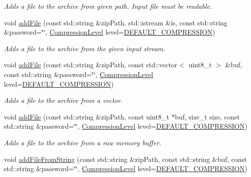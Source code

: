 \begin{DoxyCompactItemize}
\begin{DoxyCompactList}\small\item\em Adds a file to the archive from given path. Input file must be readable. \end{DoxyCompactList}\item 
void \hyperlink{group___utility_module_ga14fc46ab41bdf091a4e278e941e175a0}{add\+File} (const std\+::string \&zip\+Path, std\+::istream \&is, const std\+::string \&password=\char`\"{}\char`\"{}, \hyperlink{classdg_1_1deepcore_1_1_zip_file_afbf537eaa2281817c203388707564bdd}{Compression\+Level} level=\hyperlink{classdg_1_1deepcore_1_1_zip_file_afbf537eaa2281817c203388707564bdda62b26dddf684026102b91f79a0848012}{D\+E\+F\+A\+U\+L\+T\+\_\+\+C\+O\+M\+P\+R\+E\+S\+S\+I\+ON})
\begin{DoxyCompactList}\small\item\em Adds a file to the archive from the given input stream. \end{DoxyCompactList}\item 
void \hyperlink{group___utility_module_gafb1c01f849fc0fc4b33e33285cd39cf5}{add\+File} (const std\+::string \&zip\+Path, const std\+::vector$<$ uint8\+\_\+t $>$ \&buf, const std\+::string \&password=\char`\"{}\char`\"{}, \hyperlink{classdg_1_1deepcore_1_1_zip_file_afbf537eaa2281817c203388707564bdd}{Compression\+Level} level=\hyperlink{classdg_1_1deepcore_1_1_zip_file_afbf537eaa2281817c203388707564bdda62b26dddf684026102b91f79a0848012}{D\+E\+F\+A\+U\+L\+T\+\_\+\+C\+O\+M\+P\+R\+E\+S\+S\+I\+ON})
\begin{DoxyCompactList}\small\item\em Adds a file to the archive from a vector. \end{DoxyCompactList}\item 
void \hyperlink{group___utility_module_gaffadeb76614f94276dc5631a7f2f3a7a}{add\+File} (const std\+::string \&zip\+Path, const uint8\+\_\+t $\ast$buf, size\+\_\+t size, const std\+::string \&password=\char`\"{}\char`\"{}, \hyperlink{classdg_1_1deepcore_1_1_zip_file_afbf537eaa2281817c203388707564bdd}{Compression\+Level} level=\hyperlink{classdg_1_1deepcore_1_1_zip_file_afbf537eaa2281817c203388707564bdda62b26dddf684026102b91f79a0848012}{D\+E\+F\+A\+U\+L\+T\+\_\+\+C\+O\+M\+P\+R\+E\+S\+S\+I\+ON})
\begin{DoxyCompactList}\small\item\em Adds a file to the archive from a raw memory buffer. \end{DoxyCompactList}\item 
void \hyperlink{group___utility_module_gad85b99f9708af55dfb3074e9a0a50cf3}{add\+File\+From\+String} (const std\+::string \&zip\+Path, const std\+::string \&buf, const std\+::string \&password=\char`\"{}\char`\"{}, \hyperlink{classdg_1_1deepcore_1_1_zip_file_afbf537eaa2281817c203388707564bdd}{Compression\+Level} level=\hyperlink{classdg_1_1deepcore_1_1_zip_file_afbf537eaa2281817c203388707564bdda62b26dddf684026102b91f79a0848012}{D\+E\+F\+A\+U\+L\+T\+\_\+\+C\+O\+M\+P\+R\+E\+S\+S\+I\+ON})

\end{DoxyCompactItemize}
